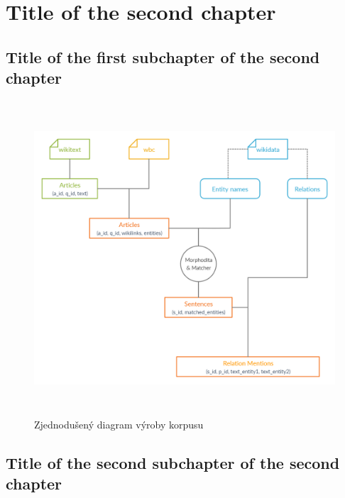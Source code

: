 \chapter{Title of the second chapter}

\section{Title of the first subchapter of the second chapter}

\begin{figure}[p]\centering
\includegraphics[width=140mm, height=117mm]{./img/Corpus_diagram}
\caption{Zjednodušený diagram výroby korpusu}
\label{obr03:Nhust}
\end{figure}


\section{Title of the second subchapter of the second chapter}
